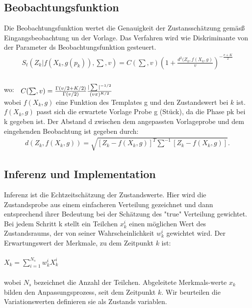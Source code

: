 \documentclass{llncs}
\begin{document}
\subsection{Beobachtungsfunktion} 
Die Beobachtungsfunktion wertet die Genauigkeit der Zustansschätzung gemäsß Eingangsbeobachtung un der Vorlage. Das Verfahren wird wie Diskriminante von der Parameter ds Beobachtungsfunktion gesteuert.
\begin{equation}
\left.\begin{array}{l}
S_t(Z_k|f(X_k, g(p_k)),\sum,v) = C(\sum, v)(1+ \frac{d^2(Z_k, f(X_k,g)}{v}  )^{-\frac{v+K}{2}}		
\\
\end{array}\right.		
\end{equation}	
\\
wo:
			$\left.\begin{array}{l}
	    C(\sum, v) =  \frac{\Gamma(v/2+K/2)  }{\Gamma(v/2) }\frac{|\sum|^{-1/2}}{(v \pi)^{K/2}}
			\end{array}\right.
\\
$
\\
wobei $f (X_k, g)$ eine Funktion des Templates g und den Zustandswert bei $k$ ist. $ f (X_k, g)$ passt sich die erwartete Vorlage Probe g (Stück), da die Phase pk bei k gegeben ist. Der Abstand d zwischen dem angepassten Vorlageprobe und dem eingehenden Beobachtung ist gegeben durch:
\begin{equation}
\left.\begin{array}{l}
d(Z_k, f(X_k, g)) = \sqrt{[Z_k - f(X_k, g)]^T \sum^{-1} [Z_k - f(X_k,g)]}.			
\end{array}\right.		
\end{equation}	

\subsection{ Inferenz und Implementation}
Inferenz ist die Echtzeitschätzung der Zustandswerte. Hier wird die  Zustandsprobe aus einem einfacheren Verteilung gezeichnet und dann entsprechend ihrer Bedeutung bei der Schätzung des "true" Verteilung gewichtet. Bei jedem Schritt k stellt ein Teilchen $x^i_k$ einen möglichen Wert des Zustandsraums, der von seiner Wahrscheinlichkeit $w^i _k$ gewichtet wird. Der Erwartungswert der Merkmale, zu dem Zeitpunkt $k$ ist:
\\
\\
$
X_k = \sum_{i=1}^{N_s}{w^i_k} X^i_k
$
\\
\\
wobei $ N_s$ bezeichnet die Anzahl der Teilchen. Abgeleitete Merkmals-werte $x_k$ bilden den Anpassungsprozess, seit dem Zeitpunkt $k$. Wir beurteilen die Variationswerten definieren sie als Zustands variablen. 
\end{document}
